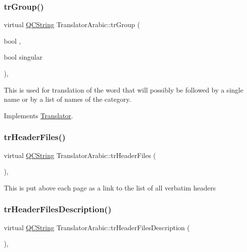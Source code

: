 \subsubsection{\texorpdfstring{trGroup()}{trGroup()}}
{\footnotesize\ttfamily virtual \mbox{\hyperlink{class_q_c_string}{Q\+C\+String}} Translator\+Arabic\+::tr\+Group (\begin{DoxyParamCaption}\item[{bool}]{,  }\item[{bool}]{singular }\end{DoxyParamCaption})\hspace{0.3cm}{\ttfamily [inline]}, {\ttfamily [virtual]}}

This is used for translation of the word that will possibly be followed by a single name or by a list of names of the category. 

Implements \mbox{\hyperlink{class_translator}{Translator}}.

\mbox{\label{class_translator_arabic_a2e6a79881591570625da5a0527f0eb8f}} 
\subsubsection{\texorpdfstring{trHeaderFiles()}{trHeaderFiles()}}
{\footnotesize\ttfamily virtual \mbox{\hyperlink{class_q_c_string}{Q\+C\+String}} Translator\+Arabic\+::tr\+Header\+Files (\begin{DoxyParamCaption}{ }\end{DoxyParamCaption})\hspace{0.3cm}{\ttfamily [inline]}, {\ttfamily [virtual]}}

This is put above each page as a link to the list of all verbatim headers \mbox{\label{class_translator_arabic_a9310846b2565427aaa4fe8a719b97382}} 
\subsubsection{\texorpdfstring{trHeaderFilesDescription()}{trHeaderFilesDescription()}}
{\footnotesize\ttfamily virtual \mbox{\hyperlink{class_q_c_string}{Q\+C\+String}} Translator\+Arabic\+::tr\+Header\+Files\+Description (\begin{DoxyParamCaption}{ }\end{DoxyParamCaption})\hspace{0.3cm}{\ttfamily [inline]}, {\ttfamily [virtual]}}

